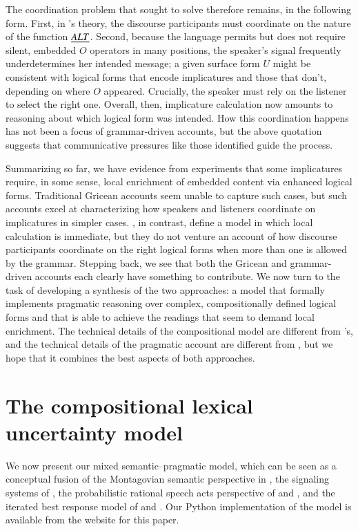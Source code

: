 \documentclass[leqno,12pt]{article}
\begin{document}
The coordination problem that \citeauthor{Grice75} sought to solve
therefore remains, in the following form. First, in \CFS's theory, the
discourse participants must coordinate on the nature of the
function $\emph{ALT}$.  Second, because the language permits but does not
require silent, embedded $O$ operators in many positions, the
speaker's signal frequently underdetermines her intended message; a
given surface form $U$ might be consistent with logical forms that
encode implicatures and those that don't, depending on where $O$
appeared. Crucially, the speaker must rely on the listener to select
the right one.  Overall, then, implicature calculation now amounts to
reasoning about which logical form was intended. How this coordination
happens has not been a focus of grammar-driven accounts, but the above
quotation suggests that communicative pressures like those
\citeauthor{Grice75} identified guide the process.

Summarizing so far, we have evidence from
 experiments that some implicatures
require, in some sense, local enrichment of embedded content via
enhanced logical forms. Traditional Gricean accounts seem unable to
capture such cases, but such accounts excel at characterizing how
speakers and listeners coordinate on implicatures in simpler
cases. \CFS, in contrast, define a model in which local calculation is
immediate, but they do not venture an account of how discourse
participants coordinate on the right logical forms when more than one
is allowed by the grammar. Stepping back, we see that both the Gricean
and grammar-driven accounts each clearly have something to
contribute. We now turn to the task of developing a synthesis of the
two approaches: a model that formally implements pragmatic reasoning
over complex, compositionally defined logical forms and that is able
to achieve the readings that seem to demand local enrichment. The
technical details of the compositional model are different from
\CFS's, and the technical details of the pragmatic account are
different from \citeauthor{Grice75}, but we hope that it combines the
best aspects of both approaches.


\section{The compositional lexical uncertainty model}\label{sec:model}

We now present our mixed semantic--pragmatic model, which can be seen
as a conceptual fusion of the Montagovian semantic perspective in
\citet{Lewis70GS}, the signaling systems of \citet{Lewis69}, the
probabilistic rational speech acts perspective of
\citet{Frank:Goodman:2012} and \citet{Goodman:Stuhlmuller:2013}, and
the iterated best response model of \citet{Jaeger:2007,Jaeger:2011}
and \citet{Franke09DISS}.  Our Python implementation of the model is
available from the website for this paper.
\end{document}
